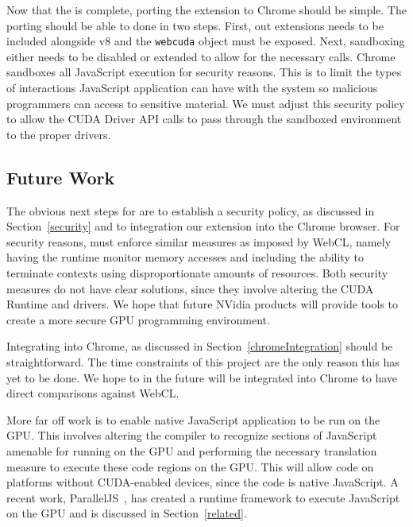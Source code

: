 Now that the \name is complete, porting the extension to Chrome should be
simple. The porting should be able to done in two steps. First, out extensions
needs to be included alongside v8 and the \texttt{webcuda} object must be
exposed.  Next, sandboxing either needs to be disabled or extended to allow for
the necessary \name calls. Chrome sandboxes all JavaScript execution for
security reasons. This is to limit the types of interactions JavaScript
application can have with the system so malicious programmers can access to
sensitive material. We must adjust this security policy to allow the CUDA Driver
API calls to pass through the sandboxed environment to the proper drivers. 


\subsection{Future Work}
\label{future}
The obvious next steps for \name are to establish a security policy, as
discussed in Section~\ref{security} and to integration our extension into the
Chrome browser. For security reasons, \name must enforce similar measures as
imposed by WebCL, namely having the runtime monitor memory accesses and
including the ability to terminate contexts using disproportionate amounts of
resources. Both security measures do not have clear solutions, since they involve
altering the CUDA Runtime and drivers. We hope that future NVidia products will
provide tools to create a more secure GPU programming environment.

Integrating \name into Chrome, as discussed in Section~\ref{chromeIntegration} should be
straightforward. The time constraints of this project are the only reason this
has yet to be done. We hope to in the future \name will be integrated into
Chrome to have direct comparisons against WebCL.

More far off work is to enable native JavaScript application to be run on the
GPU. This involves altering the compiler to recognize sections of JavaScript
amenable for running on the GPU and performing the necessary translation measure
to execute these code regions on the GPU. This will allow \name code on
platforms without CUDA-enabled devices, since the code is native JavaScript. A recent work,
ParallelJS~\cite{parallelJS}, has created a runtime framework to execute
JavaScript on the GPU and is discussed in Section~\ref{related}.


